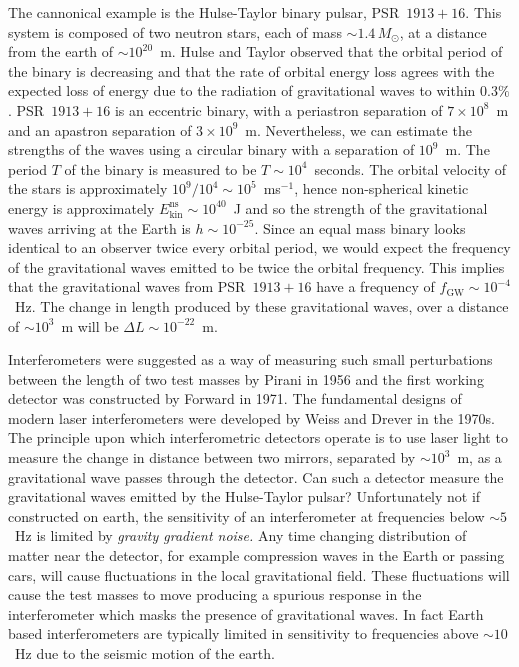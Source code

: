 The cannonical example is the Hulse-Taylor binary pulsar,
PSR~$1913+16$\cite{1975ApJ...195L..51H}. This system is composed of two
neutron stars, each of mass $\sim 1.4\,M_\odot$, at a distance from the earth
of $\sim 10^{20}$~m. Hulse and Taylor observed that the orbital period of the
binary is decreasing and that the rate of orbital energy loss agrees with the
expected loss of energy due to the radiation of gravitational waves to within
$0.3\%$\cite{Taylor:1982,Taylor:1989}. PSR~$1913+16$ is an eccentric binary,
with a periastron separation of $7\times10^{8}$~m and an apastron separation
of $3\times10^{9}$~m. Nevertheless, we can estimate the strengths of the waves
using a circular binary with a separation of $10^{9}$~m. The period $T$ of the
binary is measured to be $T\sim 10^4$~seconds.
The orbital velocity of the stars is
approximately $10^9 / 10^4 \sim 10^5$~ms$^{-1}$, hence non-spherical kinetic
energy is approximately $E^\mathrm{ns}_\mathrm{kin} \sim 10^{40}$~J and so the
strength of the gravitational waves arriving at the Earth is $h \sim
10^{-25}$. Since an equal mass binary looks identical to an observer twice
every orbital period, we would expect the frequency of the gravitational waves
emitted to be twice the orbital frequency. This implies that the gravitational
waves from PSR~$1913+16$ have a frequency of $f_\mathrm{GW} \sim 10^{-4}$~Hz.
The change in length produced by these gravitational waves, over a distance of
$\sim 10^3$~m will be $\Delta L \sim 10^{-22}$~m.

Interferometers were suggested as a way of measuring such small
perturbations between the length of two test masses by Pirani in
1956\cite{Pirani:1956} and the first working detector was constructed by
Forward in 1971\cite{Forward:1971}. The fundamental designs of modern laser
interferometers were developed by Weiss\cite{Weiss:1972} and
Drever\cite{Drever:1980} in the 1970s. The principle upon which
interferometric detectors operate is to use laser light to measure the change
in distance between two mirrors, separated by $\sim 10^{3}$~m, as a
gravitational wave passes through the detector. Can such a detector measure
the gravitational waves emitted by the Hulse-Taylor pulsar? Unfortunately not
if constructed on earth\cite{Saulson:1994}, the sensitivity of an
interferometer at frequencies below $\sim 5$~Hz is limited by \emph{gravity
gradient noise.} Any time changing distribution of matter near the detector,
for example compression waves in the Earth or passing cars, will cause
fluctuations in the local gravitational field. These fluctuations will cause
the test masses to move producing a spurious response in the interferometer
which masks the presence of gravitational waves. In fact Earth based
interferometers are typically limited in sensitivity to frequencies above
$\sim 10$~Hz due to the seismic motion of the earth.

